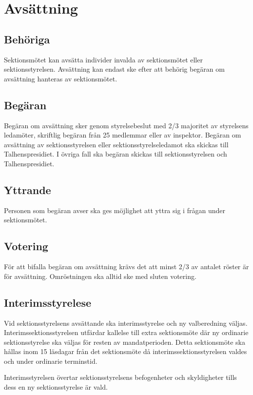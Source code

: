 \documentclass[a4paper]{dtek}
\begin{document}

\section{Avsättning}
\subsection{Behöriga}
Sektionsmötet kan avsätta individer invalda av sektionsmötet eller sektionsstyrelsen.
Avsättning kan endast ske efter att behörig begäran om avsättning hanteras av sektionsmötet.
\subsection{Begäran}
Begäran om avsättning sker genom styrelsebeslut med 2/3 majoritet av styrelsens ledamöter, skriftlig begäran från 25 medlemmar eller av inspektor.
Begäran om avsättning av sektionsstyrelsen eller sektionsstyrelseledamot ska skickas till Talhenspresidiet.
I övriga fall ska begäran skickas till sektionsstyrelsen och Talhenspresidiet.
\subsection{Yttrande}
Personen som begäran avser ska ges möjlighet att yttra sig i frågan under sektionsmötet.
\subsection{Votering}
För att bifalla begäran om avsättning krävs det att minst 2/3 av antalet röster är för avsättning.
Omröstningen ska alltid ske med sluten votering.
\subsection{Interimsstyrelese}
Vid sektionsstyrelsens avsättande ska interimsstyrelse och ny valberedning väljas.
Interimssektionsstyrelsen utfärdar kallelse till extra sektionsmöte där ny ordinarie sektionsstyrelse ska väljas för resten av mandatperioden.
Detta sektionsmöte ska hållas inom 15 läsdagar från det sektionsmöte då interimssektionsstyrelsen valdes och under ordinarie terminstid.

Interimsstyrelsen övertar sektionsstyrelsens befogenheter och skyldigheter tills dess en ny sektionsstyrelse är vald.
\newpage

\end{document}
